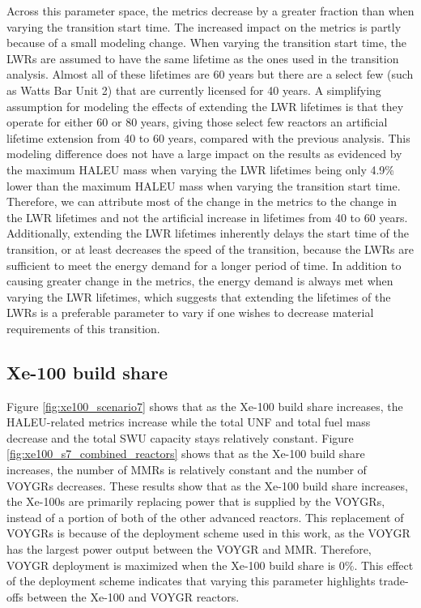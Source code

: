 Across this parameter space, the metrics decrease by a greater fraction than 
when varying the transition start time. The increased impact on the metrics 
is partly because of a small modeling change. When varying the transition 
start time, the \glspl{LWR} are assumed to have the same lifetime as the 
ones used in the transition analysis. Almost all of these lifetimes are  
60 years but there are a select few (such as Watts Bar Unit 2) that 
are currently licensed for 40 years. A simplifying assumption for 
modeling the effects of extending the \gls{LWR} lifetimes is that 
they operate for either 60 or 80 years, giving those select few reactors 
an artificial lifetime extension from 40 to 60 years, compared with the previous analysis. 
This modeling difference does not have a large impact on the results as 
evidenced by the maximum \gls{HALEU} mass when varying the \gls{LWR} lifetimes 
being only 4.9\% lower than the maximum \gls{HALEU} mass when varying the 
transition start time. Therefore, we can attribute most of the change in
the metrics to the 
change in the \gls{LWR} lifetimes and not the artificial increase in 
lifetimes from 40 to 60 years. Additionally, extending the \gls{LWR}
lifetimes inherently delays the start time of the transition, or at 
least decreases the speed of the transition, because the \glspl{LWR} 
are sufficient to meet the energy demand for a longer period of time.
In addition to causing greater change in the metrics, the energy demand 
is always met when varying the \gls{LWR} lifetimes, which suggests that 
extending the lifetimes of the \glspl{LWR} is a preferable parameter to vary 
if one wishes to decrease material requirements of this transition. 

\subsection{Xe-100 build share}
Figure \ref{fig:xe100_scenario7} shows that as the Xe-100 build share increases, 
the \gls{HALEU}-related metrics 
increase while the total \gls{UNF} and total fuel mass decrease and the 
total \gls{SWU} capacity stays relatively constant. Figure \ref{fig:xe100_s7_combined_reactors} 
shows that as the Xe-100 build share 
increases, the number of \glspl{MMR} is relatively constant and the number of 
VOYGRs decreases. These results show that as the Xe-100 build share 
increases, the Xe-100s are primarily replacing power that is supplied by 
the VOYGRs, instead of a portion of both of the other advanced reactors.
This replacement of VOYGRs is because of the deployment scheme used in this
work, as the VOYGR has the largest power output between the VOYGR and 
\gls{MMR}. Therefore, VOYGR deployment is maximized when the Xe-100 
build share is 0\%. This effect of the deployment scheme indicates that 
varying this parameter highlights trade-offs between the Xe-100 and 
VOYGR reactors.

